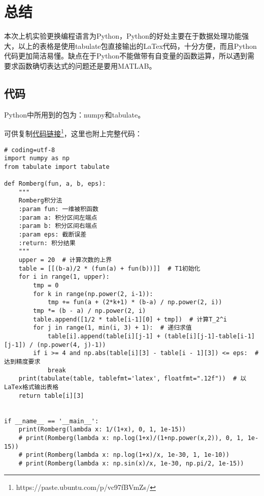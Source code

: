 \documentclass[12pt, a4paper, oneside]{ctexart}
\begin{document}
\section{总结}
本次上机实验更换编程语言为Python，Python的好处主要在于数据处理功能强大，以上的表格是使用tabulate包直接输出的LaTex代码，十分方便，而且Python代码更加简洁易懂。缺点在于Python不能做带有自变量的函数运算，所以遇到需要求函数确切表达式的问题还是要用MATLAB。
\begin{appendices}
    \section{代码}
    Python中所用到的包为：numpy和tabulate。

    可供复制\href{https://paste.ubuntu.com/p/vc97fBVmZs/}{代码链接}\footnote{https://paste.ubuntu.com/p/vc97fBVmZs/}，这里也附上完整代码：
    \begin{lstlisting}
# coding=utf-8
import numpy as np
from tabulate import tabulate

def Romberg(fun, a, b, eps):
    """
    Romberg积分法
    :param fun: 一维被积函数
    :param a: 积分区间左端点
    :param b: 积分区间右端点
    :param eps: 截断误差
    :return: 积分结果
    """
    upper = 20  # 计算次数的上界
    table = [[(b-a)/2 * (fun(a) + fun(b))]]  # T1初始化
    for i in range(1, upper):
        tmp = 0
        for k in range(np.power(2, i-1)):
            tmp += fun(a + (2*k+1) * (b-a) / np.power(2, i))
        tmp *= (b - a) / np.power(2, i)
        table.append([1/2 * table[i-1][0] + tmp])  # 计算T_2^i
        for j in range(1, min(i, 3) + 1):  # 递归求值
            table[i].append(table[i][j-1] + (table[i][j-1]-table[i-1][j-1]) / (np.power(4, j)-1))
        if i >= 4 and np.abs(table[i][3] - table[i - 1][3]) <= eps:  # 达到精度要求
            break
    print(tabulate(table, tablefmt='latex', floatfmt=".12f"))  # 以LaTex格式输出表格
    return table[i][3]


if __name__ == '__main__':
    print(Romberg(lambda x: 1/(1+x), 0, 1, 1e-15))
    # print(Romberg(lambda x: np.log(1+x)/(1+np.power(x,2)), 0, 1, 1e-15))
    # print(Romberg(lambda x: np.log(1+x)/x, 1e-30, 1, 1e-10))
    # print(Romberg(lambda x: np.sin(x)/x, 1e-30, np.pi/2, 1e-15))
    \end{lstlisting}
\end{appendices}
\end{document}
